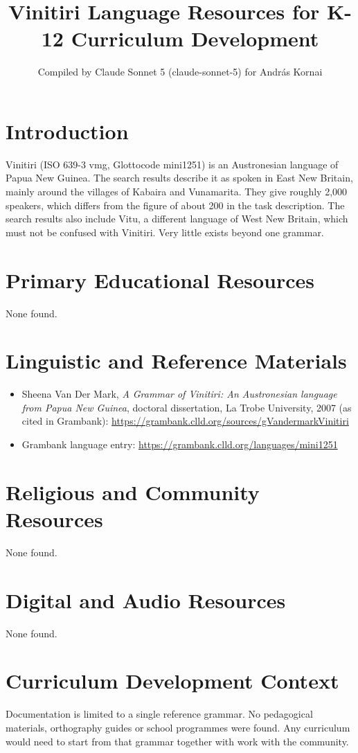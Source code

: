 \documentclass[12pt]{article}
\title{Vinitiri Language Resources for K-12 Curriculum Development}
\author{Compiled by Claude Sonnet 5 (claude-sonnet-5) for Andr\'as Kornai}
\date{}
\begin{document}
\maketitle
\section{Introduction}
Vinitiri (ISO 639-3 vmg, Glottocode mini1251) is an Austronesian language of Papua New Guinea. The search results describe it as spoken in East New Britain, mainly around the villages of Kabaira and Vunamarita. They give roughly 2,000 speakers, which differs from the figure of about 200 in the task description. The search results also include Vitu, a different language of West New Britain, which must not be confused with Vinitiri. Very little exists beyond one grammar.
\section{Primary Educational Resources}
None found.
\section{Linguistic and Reference Materials}
\begin{itemize}
\item Sheena Van Der Mark, \emph{A Grammar of Vinitiri: An Austronesian language from Papua New Guinea}, doctoral dissertation, La Trobe University, 2007 (as cited in Grambank): \url{https://grambank.clld.org/sources/gVandermarkVinitiri}
\item Grambank language entry: \url{https://grambank.clld.org/languages/mini1251}
\end{itemize}
\section{Religious and Community Resources}
None found.
\section{Digital and Audio Resources}
None found.
\section{Curriculum Development Context}
Documentation is limited to a single reference grammar. No pedagogical materials, orthography guides or school programmes were found. Any curriculum would need to start from that grammar together with work with the community.
\end{document}
